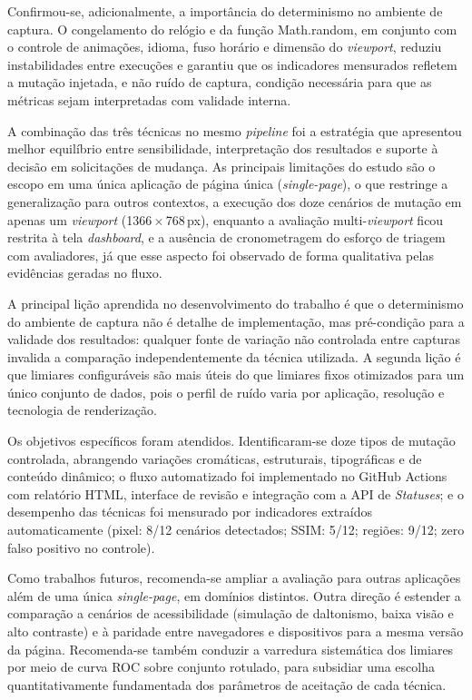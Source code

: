 \documentclass{UNESC}
\begin{document}
Confirmou-se, adicionalmente, a importância do determinismo no ambiente de captura. O congelamento do relógio e da função Math.random, em conjunto com o controle de animações, idioma, fuso horário e dimensão do \emph{viewport}, reduziu instabilidades entre execuções e garantiu que os indicadores mensurados refletem a mutação injetada, e não ruído de captura, condição necessária para que as métricas sejam interpretadas com validade interna.

A combinação das três técnicas no mesmo \emph{pipeline} foi a estratégia que apresentou melhor equilíbrio entre sensibilidade, interpretação dos resultados e suporte à decisão em solicitações de mudança. As principais limitações do estudo são o escopo em uma única aplicação de página única (\emph{single-page}), o que restringe a generalização para outros contextos, a execução dos doze cenários de mutação em apenas um \emph{viewport} (1366\,$\times$\,768\,px), enquanto a avaliação multi-\emph{viewport} ficou restrita à tela \textit{dashboard}, e a ausência de cronometragem do esforço de triagem com avaliadores, já que esse aspecto foi observado de forma qualitativa pelas evidências geradas no fluxo.

A principal lição aprendida no desenvolvimento do trabalho é que o determinismo do ambiente de captura não é detalhe de implementação, mas pré-condição para a validade dos resultados: qualquer fonte de variação não controlada entre capturas invalida a comparação independentemente da técnica utilizada. A segunda lição é que limiares configuráveis são mais úteis do que limiares fixos otimizados para um único conjunto de dados, pois o perfil de ruído varia por aplicação, resolução e tecnologia de renderização.

Os objetivos específicos foram atendidos. Identificaram-se doze tipos de mutação controlada, abrangendo variações cromáticas, estruturais, tipográficas e de conteúdo dinâmico; o fluxo automatizado foi implementado no GitHub Actions com relatório HTML, interface de revisão e integração com a API de \emph{Statuses}; e o desempenho das técnicas foi mensurado por indicadores extraídos automaticamente (pixel: 8/12 cenários detectados; SSIM: 5/12; regiões: 9/12; zero falso positivo no controle).

Como trabalhos futuros, recomenda-se ampliar a avaliação para outras aplicações além de uma única \emph{single-page}, em domínios distintos. Outra direção é estender a comparação a cenários de acessibilidade (simulação de daltonismo, baixa visão e alto contraste) e à paridade entre navegadores e dispositivos para a mesma versão da página. Recomenda-se também conduzir a varredura sistemática dos limiares por meio de curva ROC sobre conjunto rotulado, para subsidiar uma escolha quantitativamente fundamentada dos parâmetros de aceitação de cada técnica.


\renewcommand{\refname}{REFERÊNCIAS}

\end{document}
